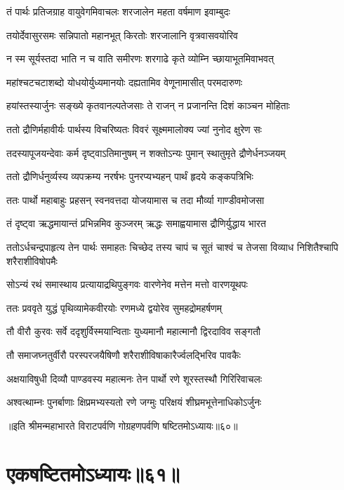 \twolineshloka
{तं पार्थः प्रतिजग्राह वायुवेगमिवाचलः}
{शरजालेन महता वर्षमाण इवाम्बुदः}


\twolineshloka
{तयोर्देवासुरसमः सन्निपातो महानभूत्}
{किरतोः शरजालानि वृत्रवासवयोरिव}


\twolineshloka
{न स्म सूर्यस्तदा भाति न च वाति समीरणः}
{शरगाढे कृते व्योम्नि च्छायाभूतमिवाभवत्}


\twolineshloka
{महांश्चटचटाशब्दो योधयोर्युध्यमानयोः}
{दह्यतामिव वेणूनामासीत् परमदारुणः}


\twolineshloka
{हयांस्तस्यार्जुनः सङ्ख्ये कृतवानल्पतेजसाः}
{ते राजन् न प्रजानन्ति दिशं काञ्चन मोहिताः}


\twolineshloka
{ततो द्रौणिर्महावीर्यः पार्थस्य विचरिष्यतः}
{विवरं सूक्ष्ममालोक्य ज्यां नुनोद क्षुरेण सः}


\twolineshloka
{तदस्यापूजयन्देवाः कर्म दृष्ट्वाऽतिमानुषम्}
{न शक्तोऽन्यः पुमान् स्थातुमृते द्रौणेर्धनञ्जयम्}


\twolineshloka
{ततो द्रौणिर्धनुर्व्यस्य व्यपक्रम्य नरर्षभः}
{पुनरप्यभ्यहन् पार्थं हृदये कङ्कपत्रिभिः}



\twolineshloka
{ततः पार्थो महाबाहुः प्रहसन् स्वनवत्तदा}
{योजयामास च तदा मौर्व्या गाण्डीवमोजसा}


\twolineshloka
{तं दृष्ट्वा ऋद्धमायान्तं प्रभिन्नमिव कुञ्जरम्}
{ऋद्धः समाह्वयामास द्रौणिर्युद्धाय भारत}


\threelineshloka
{ततोऽर्धचन्द्रपाहृत्य तेन पार्थः समाहतः}
{चिच्छेद तस्य चापं च सूतं चाश्वं च तेजसा}
{विव्याध निशितैश्चापि शरैराशीविषोपमैः}


\twolineshloka
{सोऽन्यं रथं समास्थाय प्रत्यायाद्रथिपुङ्गवः}
{वारणेनेव मत्तेन मत्तो वारणयूथपः}


\twolineshloka
{ततः प्रववृते युद्धं पृथिव्यामेकवीरयोः}
{रणमध्ये द्वयोरेव सुमहद्रोमहर्षणम्}


\twolineshloka
{तौ वीरौ कुरवः सर्वे ददृशुर्विस्मयान्विताः}
{युध्यमानौ महात्मानौ द्विरदाविव सङ्गतौ}


\twolineshloka
{तौ समाजघ्नतुर्वीरौ परस्परजयैषिणौ}
{शरैराशीविषाकारैर्ज्वलद्भिरिव पावकैः}


\twolineshloka
{अक्षयाविषुधी दिव्यौ पाण्डवस्य महात्मनः}
{तेन पार्थो रणे शूरस्तस्थौ गिरिरिवाचलः}


\twolineshloka
{अश्वत्थाम्नः पुनर्बाणाः क्षिप्रमभ्यस्यतो रणे}
{जग्मुः परिक्षयं शीघ्रमभूत्तेनाधिकोऽर्जुनः}

॥इति श्रीमन्महाभारते विराटपर्वणि गोग्रहणपर्वणि षष्टितमोऽध्यायः॥६०॥

\chapter{एकषष्टितमोऽध्यायः॥६१॥}

